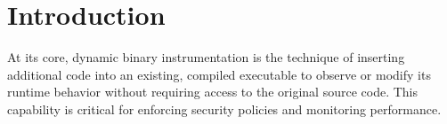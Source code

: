 \chapter{Introduction}
\label{ch:introduction}

At its core, dynamic binary instrumentation is the technique of inserting additional code into an existing, compiled executable to observe or modify its runtime behavior without requiring access to the original source code. This capability is critical for enforcing security policies and monitoring performance.

